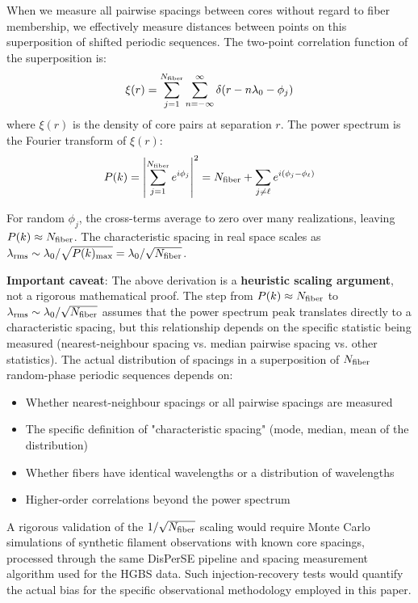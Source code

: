 \documentclass[11pt,a4paper]{article}
\begin{document}
When we measure all pairwise spacings between cores without regard to fiber membership, we effectively measure distances between points on this superposition of shifted periodic sequences. The two-point correlation function of the superposition is:
\begin{equation}
\xi(r) = \sum_{j=1}^{N_{\rm fiber}} \sum_{n=-\infty}^{\infty} \delta(r - n\lambda_0 - \phi_j)
\end{equation}
where $\xi(r)$ is the density of core pairs at separation $r$. The power spectrum is the Fourier transform of $\xi(r)$:
\begin{equation}
P(k) = \left|\sum_{j=1}^{N_{\rm fiber}} e^{i\phi_j}\right|^2 = N_{\rm fiber} + \sum_{j \neq \ell} e^{i(\phi_j - \phi_\ell)}
\end{equation}

For random $\phi_j$, the cross-terms average to zero over many realizations, leaving $P(k) \approx N_{\rm fiber}$. The characteristic spacing in real space scales as $\lambda_{\rm rms} \sim \lambda_0/\sqrt{P(k)_{\rm max}} = \lambda_0/\sqrt{N_{\rm fiber}}$.

\textbf{Important caveat}: The above derivation is a \textbf{heuristic scaling argument}, not a rigorous mathematical proof. The step from $P(k) \approx N_{\rm fiber}$ to $\lambda_{\rm rms} \sim \lambda_0/\sqrt{N_{\rm fiber}}$ assumes that the power spectrum peak translates directly to a characteristic spacing, but this relationship depends on the specific statistic being measured (nearest-neighbour spacing vs. median pairwise spacing vs. other statistics). The actual distribution of spacings in a superposition of $N_{\rm fiber}$ random-phase periodic sequences depends on:
\begin{itemize}
    \item Whether nearest-neighbour spacings or all pairwise spacings are measured
    \item The specific definition of "characteristic spacing" (mode, median, mean of the distribution)
    \item Whether fibers have identical wavelengths or a distribution of wavelengths
    \item Higher-order correlations beyond the power spectrum
\end{itemize}

A rigorous validation of the $1/\sqrt{N_{\rm fiber}}$ scaling would require Monte Carlo simulations of synthetic filament observations with known core spacings, processed through the same DisPerSE pipeline and spacing measurement algorithm used for the HGBS data. Such injection-recovery tests would quantify the actual bias for the specific observational methodology employed in this paper.
\end{document}
